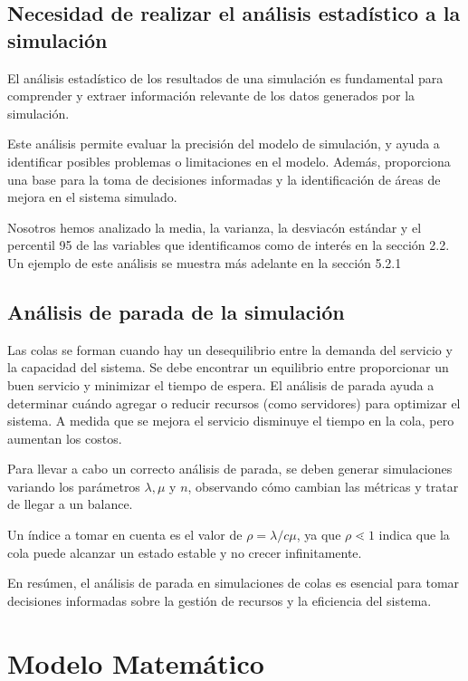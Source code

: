 \documentclass[11pt]{article}
\begin{document}
    \subsection{Necesidad de realizar el análisis estadístico a la simulación}
    El análisis estadístico de los resultados de una simulación es fundamental para comprender y extraer información
    relevante de los datos generados por la simulación.

    Este análisis permite evaluar la precisión del modelo de simulación, y ayuda
    a identificar posibles problemas o limitaciones en el modelo. Además, proporciona una base para
    la toma de decisiones informadas y la identificación de áreas de mejora en el sistema simulado.

    Nosotros hemos analizado la media, la varianza, la desviacón estándar y el percentil 95 de las variables que identificamos
    como de interés en la sección 2.2. Un ejemplo de este análisis se muestra más adelante en la sección 5.2.1


    \subsection{Análisis de parada de la simulación}
    Las colas se forman cuando hay un desequilibrio entre la demanda del servicio y la capacidad del sistema.
    Se debe encontrar un equilibrio entre proporcionar un buen servicio y minimizar el tiempo de espera.
    El análisis de parada ayuda a determinar cuándo agregar o reducir recursos (como servidores) para optimizar el sistema.
    A medida que se mejora el servicio disminuye el tiempo en la cola, pero aumentan los costos.

    Para llevar a cabo un correcto análisis de parada, se deben generar simulaciones variando los parámetros $\lambda , \mu$ y $n $, observando cómo cambian las métricas
    y tratar de llegar a un balance.

    Un índice a tomar en cuenta es el valor de $\rho = \lambda /c\mu$, ya que  $\rho \lessdot 1$ indica que la cola puede
    alcanzar un estado estable y no crecer infinitamente.

    En resúmen, el análisis de parada en simulaciones de colas es esencial para tomar decisiones informadas sobre la gestión de recursos y la
    eficiencia del sistema.



    \section{Modelo Matemático}
\end{document}

